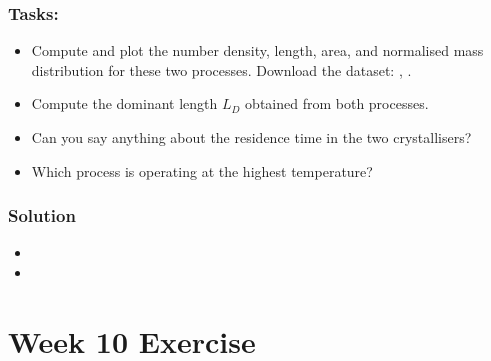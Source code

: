 \documentclass[letterpaper,10pt,english]{jupyterBook}
\begin{document}
\subsubsection{Tasks:}
\label{\detokenize{Exercise_W9_2021:tasks}}\begin{itemize}
\item {} 
\sphinxAtStartPar
Compute and plot the number density, length, area, and normalised mass distribution for these two processes. Download the dataset: , .

\item {} 
\sphinxAtStartPar
Compute the dominant length \(L_D\) obtained from both processes.

\item {} 
\sphinxAtStartPar
Can you say anything about the residence time in the two crystallisers?

\item {} 
\sphinxAtStartPar
Which process is operating at the highest temperature?

\end{itemize}


\subsubsection{Solution}
\label{\detokenize{Exercise_W9_2021:solution}}\begin{itemize}
\item {} 
\sphinxAtStartPar
{}

\item {} 
\sphinxAtStartPar
{}

\end{itemize}

\sphinxstepscope


\section{Week 10 \sphinxhyphen{} Exercise}
\label{\detokenize{Exercise_W10_2021:week-10-exercise}}\label{\detokenize{Exercise_W10_2021::doc}}
\end{document}
